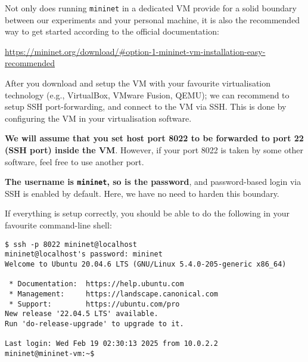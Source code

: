 \documentclass{article}
\newcommand{\mininet}{\texttt{mininet}}
\begin{document}
Not only does running \mininet{} in a dedicated VM provide for a solid
boundary between our experiments and your personal machine, it is also
the recommended way to get started according to the official
documentation:

\begin{center}

\url{https://mininet.org/download/\#option-1-mininet-vm-installation-easy-recommended}

\end{center}

After you download and setup the VM with your favourite virtualisation
technology (e.g., VirtualBox, VMware Fusion, QEMU); we can recommend
to setup SSH port-forwarding, and connect to the VM via SSH. This is
done by configuring the VM in your virtualisation software.

\textbf{We will assume that you set host port 8022 to be forwarded to
port 22 (SSH port) inside the VM}. However, if your port 8022 is taken
by some other software, feel free to use another port.

\textbf{The username is \texttt{mininet}, so is the password}, and
password-based login via SSH is enabled by default. Here, we have no need
to harden this boundary.

If everything is setup correctly, you should be able to do the
following in your favourite command-line shell:

\begin{lstlisting}
$ ssh -p 8022 mininet@localhost
mininet@localhost's password: mininet
Welcome to Ubuntu 20.04.6 LTS (GNU/Linux 5.4.0-205-generic x86_64)

 * Documentation:  https://help.ubuntu.com
 * Management:     https://landscape.canonical.com
 * Support:        https://ubuntu.com/pro
New release '22.04.5 LTS' available.
Run 'do-release-upgrade' to upgrade to it.

Last login: Wed Feb 19 02:30:13 2025 from 10.0.2.2
mininet@mininet-vm:~$
\end{lstlisting}
\end{document}
